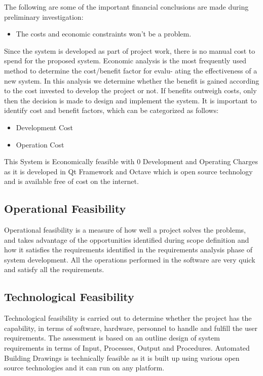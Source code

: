 The following are some of the important financial conclusions are made during preliminary investigation:
\begin{itemize}
	\item The costs and economic constraints won't be a problem.
\end{itemize}

Since the system is developed as part of project work, there is no manual cost to spend for the proposed system. 
\noindent Economic analysis is the most frequently used method to determine the cost/benefit factor for evalu-
ating the effectiveness of a new system. In this analysis we determine whether the benefit is gained
according to the cost invested to develop the project or not. If benefits outweigh costs, only then
the decision is made to design and implement the system. It is important to identify cost and benefit
factors, which can be categorized as follows:
\begin{itemize}
\item Development Cost
\item Operation Cost
\end{itemize}
This System is Economically feasible with 0 Development and Operating Charges
as it is developed in Qt Framework and Octave which is open source technology and is available free of cost on the internet.

\subsection{Operational Feasibility}
\noindent Operational feasibility is a measure of how well a project solves the problems, and takes advantage of the opportunities identified during scope definition and how it satisfies the requirements identified in the requirements analysis phase of system development. All the operations performed in the software are very quick and satisfy all the requirements.
\subsection{Technological Feasibility}
\noindent Technological feasibility is carried out to determine whether the project has the capability, in terms
of software, hardware, personnel to handle and fulfill the user requirements. The assessment is based
on an outline design of system requirements in terms of Input, Processes, Output and Procedures.
Automated Building Drawings is technically feasible as it is built up using various open source technologies and it can run on any platform.
